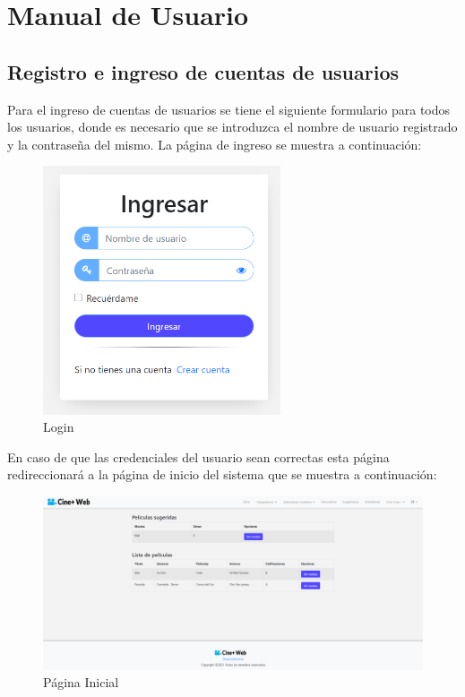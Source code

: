 \appendix
\chapter{Manual de Usuario}
\section{Registro e ingreso de cuentas de usuarios}

Para el ingreso de cuentas de usuarios  se tiene el siguiente formulario para todos los usuarios, donde es necesario que se introduzca el nombre de usuario registrado y la contraseña del mismo. La página de ingreso se muestra a continuación:\\

\begin{figure}[h!]
	\centering
	\includegraphics[width=7cm]{./chapters/img/login.png}
	
	\label{fig:login}
	\caption{Login}
\end{figure}

En caso de que las credenciales del usuario sean correctas esta página redireccionará a la página de inicio del sistema que se muestra a continuación:\\

\begin{figure}[h!]
	\centering
	\includegraphics[scale=0.35]{./chapters/img/Index.png}
	
	\label{fig:Index}
	\caption{P\'agina Inicial}
\end{figure}
\newpage

